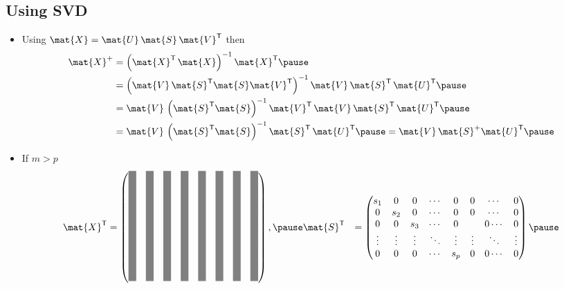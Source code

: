 \begin{slide}
\section[-2]{Using SVD}

\begin{PauseHighLight}
  \begin{itemize}
  \item Using $\mat{X} = \mat{U}\,\mat{S}\,\mat{V}^\tr$ then
    \begin{align*}
      \mat{X}^{+} &= \left(\mat{X}^\tr\,\mat{X}\right)^{-1} \mat{X}^\tr \pause\\
      &=  \left(\mat{V}\,\mat{S}^\tr\mat{S} \mat{V}^\tr\right)^{-1}
        \mat{V}\,\mat{S}^\tr\,\mat{U}^\tr\pause \\
      &= \mat{V}\,\left(\mat{S}^\tr\mat{S}\right)^{-1}
        \mat{V}^\tr\,\mat{V}\,\mat{S}^\tr\,\mat{U}^\tr\pause\\
      &= \mat{V}\,\left(\mat{S}^\tr\mat{S}\right)^{-1}\mat{S}^\tr\,\mat{U}^\tr\pause
      = \mat{V}\,\mat{S}^{+} \mat{U}^\tr\pause
    \end{align*}
  \item If $m>p${\small
    \begin{align*}
      \mat{X}^\tr &= \begin{pmatrix}
        \textcolor{gray}{\rule{8pt}{4cm}} &
        \textcolor{gray}{\rule{8pt}{4cm}} &
        \textcolor{gray}{\rule{8pt}{4cm}} &
        \textcolor{gray}{\rule{8pt}{4cm}} &
        \textcolor{gray}{\rule{8pt}{4cm}} &
        \textcolor{gray}{\rule{8pt}{4cm}} &
        \textcolor{gray}{\rule{8pt}{4cm}} &
        \textcolor{gray}{\rule{8pt}{4cm}} 
      \end{pmatrix},\pause
      \mat{S}^\tr &= \begin{pmatrix}
        s_1 & 0 & 0 & \cdots & 0 & 0 & \cdots & 0 \\
        0 & s_2 & 0 & \cdots & 0 & 0 & \cdots & 0 \\
        0 & 0 & s_3 & \cdots & 0 & & 0 \cdots & 0 \\
        \vdots & \vdots & \vdots & \ddots & \vdots & \vdots & \ddots & \vdots \\
        0 & 0 & 0 & \cdots & s_p & 0 & 0 \cdots & 0
        \end{pmatrix}\pause
    \end{align*}}
  \end{itemize}
\end{PauseHighLight}

\end{slide}


